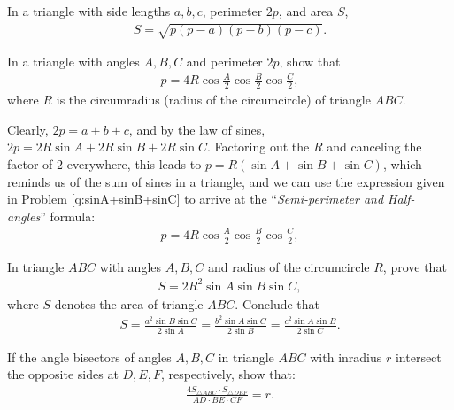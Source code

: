 \documentclass[12pt,a4paper]{memoir}
\theoremstyle{definition}
\begin{document}
	\begin{question}[name=Heron's Formula]
		In a triangle with side lengths $a,b,c$, perimeter $2p$, and area $S$,
		\begin{align*}
			S= \sqrt{p(p-a)(p-b)(p-c)}.
		\end{align*}
	\end{question}




	\begin{question}[name=Semi-perimeter and Cosine of Half-angles]\label{q:semiperimeter-halfangles}
		In a triangle with angles $A,B,C$ and perimeter $2p$, show that
		\begin{align*}
			p = 4R \cos \frac{A}{2} \cos \frac{B}{2} \cos \frac{C}{2},
		\end{align*}
		where $R$ is the circumradius (radius of the circumcircle) of triangle $ABC$.
	\end{question}


\begin{solution}
	Clearly, $2p=a+b+c$, and by the law of sines, $2p=2R\sin A + 2R\sin B + 2R \sin C$. Factoring out the $R$ and canceling the factor of $2$ everywhere, this leads to $p=R(\sin A + \sin B + \sin C)$, which reminds us of the sum of sines in a triangle, and we can use the expression given in Problem \ref{q:sinA+sinB+sinC} to arrive at the ``\textit{Semi-perimeter and Half-angles}'' formula:
	\begin{align*}
		p = 4R \cos \frac{A}{2} \cos \frac{B}{2} \cos \frac{C}{2},
	\end{align*}
\end{solution}




	\begin{question}[name=Area in Terms of Sine of Angles]\label{q:area-sin}
		In triangle $ABC$ with angles $A,B,C$ and radius of the circumcircle $R$, prove that
		\begin{align*}
			S = 2R^2 \sin A \sin B \sin C,
		\end{align*}
		where $S$ denotes the area of triangle $ABC$. Conclude that
		\begin{align*}
			S = \frac{a^2 \sin B \sin C}{2 \sin A} = \frac{b^2 \sin A \sin C}{2 \sin B} = \frac{c^2 \sin A \sin B}{2 \sin C}.
		\end{align*}
	\end{question}


\begin{question}
	If the angle bisectors of angles $A,B,C$ in triangle $ABC$ with inradius $r$ intersect the opposite sides at $D,E,F$, respectively, show that:
	\begin{align*}
		\frac{4S_{\triangle ABC}\cdot S_{\triangle DEF}}{AD \cdot BE \cdot CF}=r.
	\end{align*}
\end{question}
\end{document}
